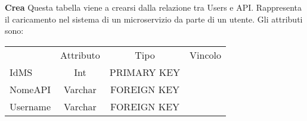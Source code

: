 {{		\textbf{Crea}
			Questa tabella viene a crearsi dalla relazione tra Users e API. Rappresenta il caricamento nel sistema di un microservizio da parte di un utente. Gli attributi sono:
			\begin{center}
			\begin{tabular}{lccc}
				&Attributo&Tipo&Vincolo\\
				IdMS&Int&PRIMARY KEY\\
				NomeAPI&Varchar&FOREIGN KEY\\
				Username&Varchar&FOREIGN KEY\\			
			\end{tabular}
			\end{center}
			
		}
	
}